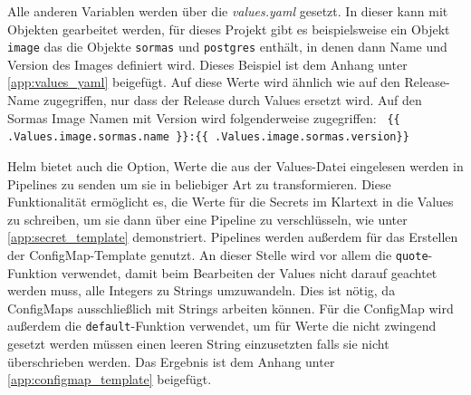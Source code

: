 Alle anderen Variablen werden über die \textit{values.yaml} gesetzt.
In dieser kann mit Objekten gearbeitet werden, für dieses Projekt gibt es beispielsweise ein Objekt \texttt{image} das die Objekte \texttt{sormas} und \texttt{postgres} enthält, in denen dann Name und Version des Images definiert wird. 
Dieses Beispiel ist dem Anhang unter \ref{app:values_yaml} beigefügt.
Auf diese Werte wird ähnlich wie auf den Release-Name zugegriffen, nur dass der Release durch Values ersetzt wird.
Auf den Sormas Image Namen mit Version wird folgenderweise zugegriffen: \texttt{ \{\{ .Values.image.sormas.name \}\}:\{\{ .Values.image.sormas.version\}\} }

Helm bietet auch die Option, Werte die aus der Values-Datei eingelesen werden in Pipelines zu senden um sie in beliebiger Art zu transformieren. 
Diese Funktionalität ermöglicht es, die Werte für die Secrets im Klartext in die Values zu schreiben, um sie dann über eine Pipeline zu verschlüsseln, wie unter \ref{app:secret_template} demonstriert.
Pipelines werden außerdem für das Erstellen der ConfigMap-Template genutzt. 
An dieser Stelle wird vor allem die \texttt{quote}-Funktion verwendet, damit beim Bearbeiten der Values nicht darauf geachtet werden muss, alle Integers zu Strings umzuwandeln. 
Dies ist nötig, da ConfigMaps ausschließlich mit Strings arbeiten können.
Für die ConfigMap wird außerdem die \texttt{default}-Funktion verwendet, um für Werte die nicht zwingend gesetzt werden müssen einen leeren String einzusetzten falls sie nicht überschrieben werden.
Das Ergebnis ist dem Anhang unter \ref{app:configmap_template} beigefügt.